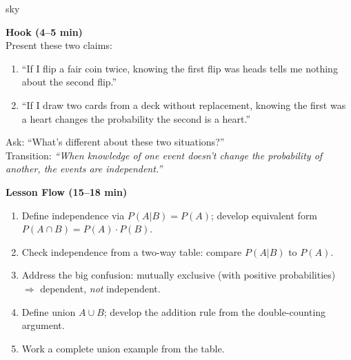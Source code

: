 \documentclass[10pt]{article}
\begin{document}
\begin{skillbox}{sky}
\begin{minipage}[t]{0.48\linewidth}
    \textbf{Hook (4--5 min)}\\
    Present these two claims:
    \begin{enumerate}
        \item ``If I flip a fair coin twice, knowing the first flip was heads tells me
              nothing about the second flip.''
        \item ``If I draw two cards from a deck without replacement, knowing the first
              was a heart changes the probability the second is a heart.''
    \end{enumerate}
    Ask: ``What's different about these two situations?''\\[4pt]
    Transition: \textit{``When knowledge of one event doesn't change the probability
    of another, the events are independent.''}
\end{minipage}
\hfill
\begin{minipage}[t]{0.48\linewidth}
    \textbf{Lesson Flow (15--18 min)}
    \begin{enumerate}
        \item Define independence via $P(A|B) = P(A)$; develop equivalent form
              $P(A \cap B) = P(A) \cdot P(B)$.
        \item Check independence from a two-way table: compare $P(A|B)$ to $P(A)$.
        \item Address the big confusion: mutually exclusive (with positive probabilities)
              $\Rightarrow$ dependent, \emph{not} independent.
        \item Define union $A \cup B$; develop the addition rule from the
              double-counting argument.
        \item Work a complete union example from the table.
    \end{enumerate}
\end{minipage}
\end{skillbox}
\end{document}
